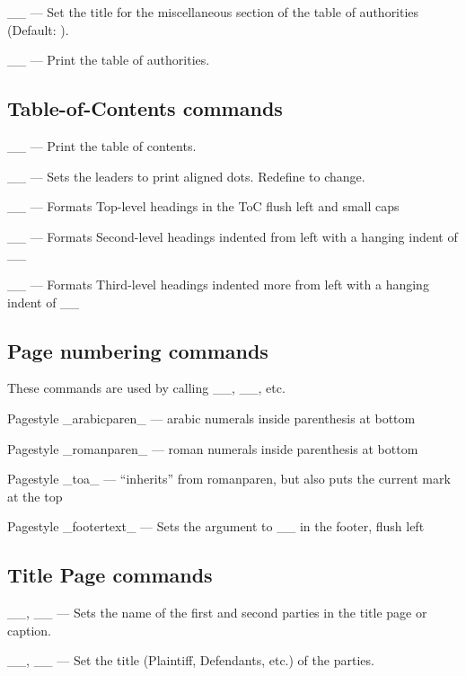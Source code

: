 \noindent
_\otherindextitle_ --- Set the title for the miscellaneous section of the table of authorities (Default: \@otherindextitle).


 \noindent _\tableofauthorities_ --- Print the table of authorities.


 \subsection{Table-of-Contents commands}


_\tableofcontents_ --- Print the table of contents.


\noindent _\@tocline_ --- Sets the leaders to print aligned dots. Redefine to change.


\noindent _\l@section_ --- Formats Top-level headings in the ToC flush left and small caps


\noindent _\l@subsection_ --- Formats Second-level headings indented from left with a hanging indent of _\@pnumwidth_


\noindent _\l@subsubsection_ --- Formats Third-level headings indented more from left with a hanging indent of _\@pnumwidth_


 \subsection{Page numbering commands}

 These commands are used by calling _\pagestyle{romanparen}_, _\thispagestyle{toa}_, etc.


 \noindent Pagestyle _arabicparen_ --- arabic numerals inside parenthesis at bottom


 \noindent Pagestyle _romanparen_ --- roman numerals inside parenthesis at bottom


 \noindent Pagestyle _toa_ --- ``inherits'' from romanparen, but also puts the current mark at the top


 \noindent Pagestyle _footertext_ --- Sets the argument to _\footertext_ in the footer, flush left

 \subsection{Title Page commands}

 \noindent _\firstparty_, _\secondparty_ --- Sets the name of the first and second parties in the title page or caption.

 \noindent _\firstpartytitle_, _\secondpartytitle_ --- Set the title (Plaintiff, Defendants, etc.) of the parties.

